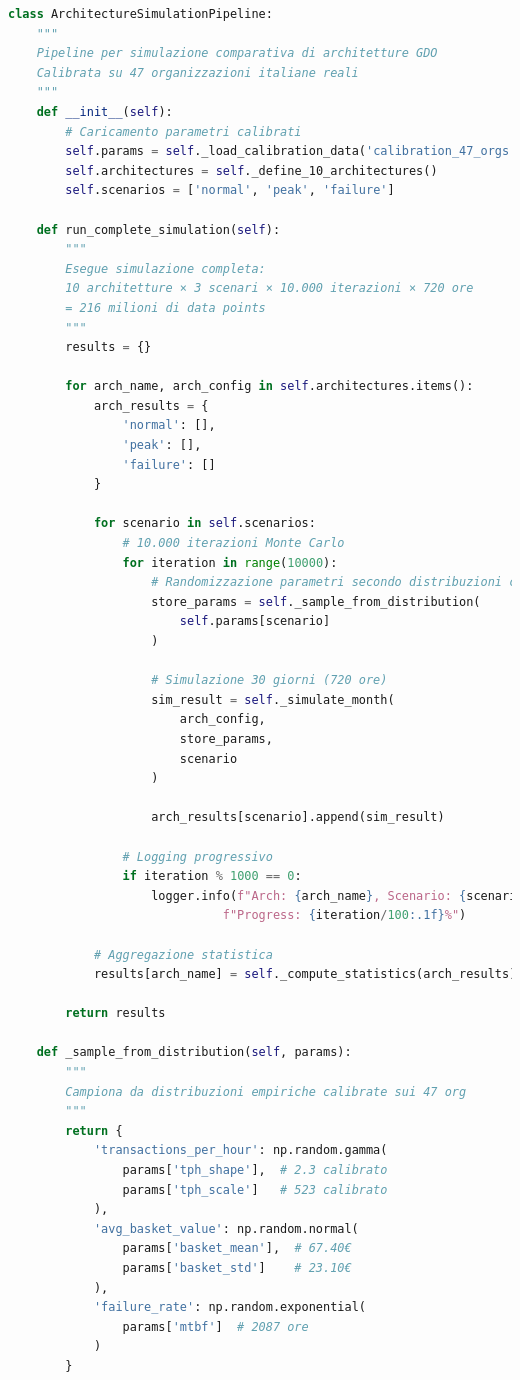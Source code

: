 \begin{lstlisting}[language=Python, caption={Pipeline di Simulazione Multi-Architettura}]
class ArchitectureSimulationPipeline:
    """
    Pipeline per simulazione comparativa di architetture GDO
    Calibrata su 47 organizzazioni italiane reali
    """
    def __init__(self):
        # Caricamento parametri calibrati
        self.params = self._load_calibration_data('calibration_47_orgs.pkl')
        self.architectures = self._define_10_architectures()
        self.scenarios = ['normal', 'peak', 'failure']
        
    def run_complete_simulation(self):
        """
        Esegue simulazione completa:
        10 architetture × 3 scenari × 10.000 iterazioni × 720 ore
        = 216 milioni di data points
        """
        results = {}
        
        for arch_name, arch_config in self.architectures.items():
            arch_results = {
                'normal': [],
                'peak': [],  
                'failure': []
            }
            
            for scenario in self.scenarios:
                # 10.000 iterazioni Monte Carlo
                for iteration in range(10000):
                    # Randomizzazione parametri secondo distribuzioni calibrate
                    store_params = self._sample_from_distribution(
                        self.params[scenario]
                    )
                    
                    # Simulazione 30 giorni (720 ore)
                    sim_result = self._simulate_month(
                        arch_config, 
                        store_params,
                        scenario
                    )
                    
                    arch_results[scenario].append(sim_result)
                    
                # Logging progressivo
                if iteration % 1000 == 0:
                    logger.info(f"Arch: {arch_name}, Scenario: {scenario}, "
                              f"Progress: {iteration/100:.1f}%")
            
            # Aggregazione statistica
            results[arch_name] = self._compute_statistics(arch_results)
            
        return results
    
    def _sample_from_distribution(self, params):
        """
        Campiona da distribuzioni empiriche calibrate sui 47 org
        """
        return {
            'transactions_per_hour': np.random.gamma(
                params['tph_shape'],  # 2.3 calibrato
                params['tph_scale']   # 523 calibrato
            ),
            'avg_basket_value': np.random.normal(
                params['basket_mean'],  # 67.40€
                params['basket_std']    # 23.10€
            ),
            'failure_rate': np.random.exponential(
                params['mtbf']  # 2087 ore
            )
        }
\end{lstlisting}

